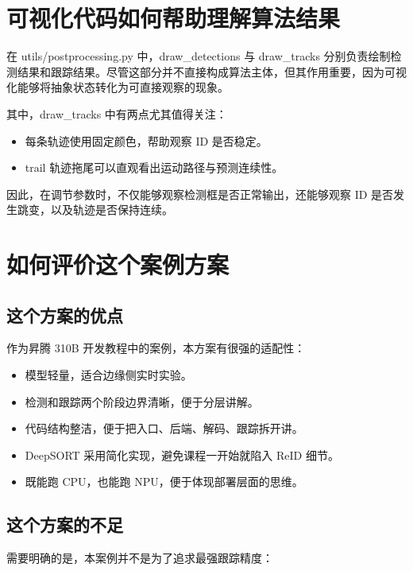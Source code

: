 \section{可视化代码如何帮助理解算法结果}\label{src-experiment-case2-h57}

在 utils/postprocessing.py 中，draw\_detections 与 draw\_tracks
分别负责绘制检测结果和跟踪结果。尽管这部分并不直接构成算法主体，但其作用重要，因为可视化能够将抽象状态转化为可直接观察的现象。

其中，draw\_tracks 中有两点尤其值得关注：

\begin{itemize}
\tightlist
\item
  每条轨迹使用固定颜色，帮助观察 ID 是否稳定。
\item
  trail 轨迹拖尾可以直观看出运动路径与预测连续性。
\end{itemize}

因此，在调节参数时，不仅能够观察检测框是否正常输出，还能够观察 ID
是否发生跳变，以及轨迹是否保持连续。

\section{如何评价这个案例方案}\label{src-experiment-case2-h58}

\subsection{这个方案的优点}\label{src-experiment-case2-h59}

作为昇腾 310B 开发教程中的案例，本方案有很强的适配性：

\begin{itemize}
\tightlist
\item
  模型轻量，适合边缘侧实时实验。
\item
  检测和跟踪两个阶段边界清晰，便于分层讲解。
\item
  代码结构整洁，便于把入口、后端、解码、跟踪拆开讲。
\item
  DeepSORT 采用简化实现，避免课程一开始就陷入 ReID 细节。
\item
  既能跑 CPU，也能跑 NPU，便于体现部署层面的思维。
\end{itemize}

\subsection{这个方案的不足}\label{src-experiment-case2-h60}

需要明确的是，本案例并不是为了追求最强跟踪精度：


